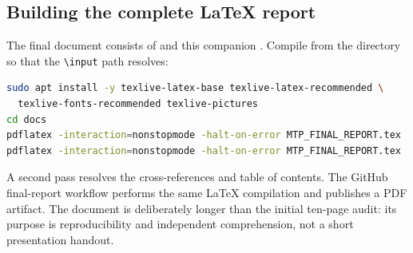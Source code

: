 \subsection{Building the complete LaTeX report}
The final document consists of  and this companion .  Compile from the  directory so that the \texttt{\textbackslash input} path resolves:
\begin{lstlisting}[language=bash]
sudo apt install -y texlive-latex-base texlive-latex-recommended \
  texlive-fonts-recommended texlive-pictures
cd docs
pdflatex -interaction=nonstopmode -halt-on-error MTP_FINAL_REPORT.tex
pdflatex -interaction=nonstopmode -halt-on-error MTP_FINAL_REPORT.tex
\end{lstlisting}
A second pass resolves the cross-references and table of contents.  The GitHub final-report workflow performs the same LaTeX compilation and publishes a PDF artifact.  The document is deliberately longer than the initial ten-page audit: its purpose is reproducibility and independent comprehension, not a short presentation handout.

